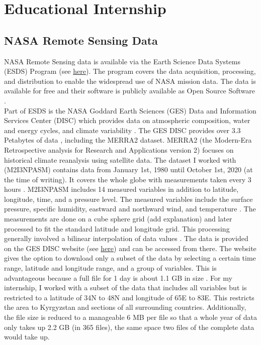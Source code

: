 \documentclass[../00_main.tex]{subfiles}
\begin{document}
\section{Educational Internship}

\subsection{NASA Remote Sensing Data}

NASA Remote Sensing data is available via the Earth Science Data Systems (ESDS)
Program (see \href{https://earthdata.nasa.gov/esds}{here}). The program covers the
data acquisition, processing, and distribution to enable the
widespread use of NASA mission data. The data is available for free and their
software is publicly available as Open Source Software \cite{esds-website}.\\ 
Part of ESDS is the NASA Goddard Earth Sciences (GES) Data and Information 
Services Center (DISC) which provides data on atmospheric composition, water
and energy cycles, and climate variability \cite{gesdisc-about}. 
The GES DISC provides over 3.3 Petabytes of data \cite{gesdisc-main},
including the MERRA2 dataset. MERRA2 (the Modern-Era Retrospective analysis for
Research and Applications version 2) focuses on historical climate reanalysis
using satellite data. The dataset I worked with (M2I3NPASM) contains data from
January 1st, 1980 until October 1st, 2020 (at the time of writing). It covers
the whole globe with measurements taken every 3 hours \cite{data-summary}.
M2I3NPASM includes 14 measured variables in addition to latitude, longitude,
time, and a pressure level. The measured variables include the surface pressure,
specific humidity, eastward and northward wind, and temperature
\cite{data-readme}. 
The measurements are done on a cube sphere grid (add explanation) and later
processed to fit the standard latitude and longitude grid. This processing
generally involved a bilinear interpolation of data values \cite{merra2-files}.
\newline
The data is provided on the GES DISC website (see
\href{https://disc.gsfc.nasa.gov/datasets/M2I3NPASM_5.12.4/summary}{here}) and can be
accessed from there. The website gives the option to download only a subset of
the data by selecting a certain time range, latitude and longitude range, and
a group of variables. This is advantageous because a full file for 1 day is about
1.1 GB in size \cite{data-readme}.
For my internship, I worked with a subset of the data that includes all
variables but is restricted to a latitude of 34\textdegree{}N to
48\textdegree{}N and longitude of 65\textdegree{}E to 83\textdegree{}E. This
restricts the area to Kyrgyzstan and sections of all surrounding countries.
Additionally, the file size is reduced to a manageable 6 MB per file so that
a whole year of data only takes up 2.2 GB (in 365 files), the same space two
files of the complete data would take up.
\end{document}
